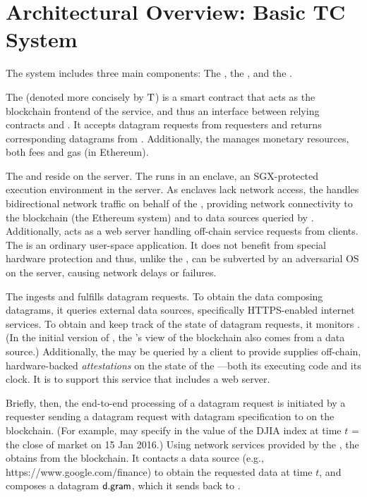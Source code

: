 \section{Architectural Overview: Basic TC System}

The \tcs system includes three main components: The \tcontract, the \encname, and the \medname.

The \tcontract (denoted more concisely by $\tcont$) is a smart contract that acts as the blockchain frontend of the \tc service, and thus an interface between relying contracts and \tc. It accepts datagram requests from requesters and returns corresponding datagrams from \tc. Additionally, the \tcontract manages \tc monetary resources, both fees and gas (in Ethereum). 

The \encname and \medname reside on the \tc server. The \encname runs in an enclave, an SGX-protected execution environment in the server. As enclaves lack network access, the \medname handles bidirectional network traffic on behalf of the \encname, providing network connectivity to the blockchain (the Ethereum system) and to data sources queried by \encname. Additionally, \medname acts as a web server handling off-chain service requests from clients. The \medname is an ordinary user-space application. It does not benefit from special hardware protection and thus, unlike the \encname, can be subverted by an adversarial OS on the \tc server, causing network delays or failures.

The \encname ingests and fulfills datagram requests. To obtain the data composing datagrams, it queries external data sources, specifically HTTPS-enabled internet services. To obtain and keep track of the state of datagram requests, it monitors \tcontract. (In the initial version of \tcontract, the \encname's view of the blockchain also comes from a data source.) Additionally, the \encname may be queried by a client to provide supplies off-chain, hardware-backed \emph{attestations} on the state of the \encname---both its executing code and its clock. It is to support this service that \medname includes a web server.

Briefly, then, the end-to-end processing of a datagram request is initiated by a requester \reqcont sending a datagram request \dgreq with datagram specification \dgform to \tcont on the blockchain. (For example, \dgreq may specify in \dgform the value of the DJIA index at time $t$ = the close of market on 15 Jan 2016.) Using network services provided by the \medname, the \encname obtains \dgreq from the blockchain. It contacts a data source (e.g., https://www.google.com/finance) to obtain the requested data at time $t$, and composes a datagram ${\sf d.gram}$, which it sends back to \reqcont.



